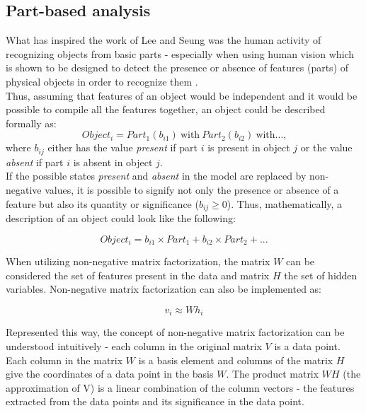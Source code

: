 \documentclass[thesis=M,english]{FITthesis}[2012/10/20]
\begin{document}
\subsection{Part-based analysis}
What has inspired the work of Lee and Seung \cite{lee99} was the human activity
of recognizing objects from basic parts - especially when using human vision which
is shown to be designed to detect the presence or absence of features (parts)
of physical objects in order to recognize them \cite{component-recognition}.
\\

Thus, assuming that features of an object would be independent and it would be
possible to compile all the features together, an object could be described
formally as:
\begin{equation}
  Object_{i} = Part_{1}(b_{i1})~\text{with}~Part_{2}(b_{i2})~\text{with...,}
\end{equation}
where $b_{ij}$ either has the value \emph{present} if part $i$ is present in object $j$ or
the value \emph{absent} if part $i$ is absent in object $j$.
\\

If the possible states \emph{present} and \emph{absent} in the model are
replaced by non-negative values, it is possible to signify not only the
presence or absence of a feature but also its quantity or significance
($b_{ij} \geq 0$). Thus, mathematically, a description of an object could
look like the following:

\begin{equation}
  Object_{i} = b_{i1} \times Part_{1} + b_{i2} \times Part_{2} + ...
\end{equation}\cite{nmf-phd-thesis}

When utilizing non-negative matrix factorization, the matrix $W$ can be
considered the set of features present in the data and matrix $H$ the set
of hidden variables. Non-negative matrix factorization can also be implemented
as:

\begin{equation}
  v_{i} \approx Wh_{i}
\end{equation}

Represented this way, the concept of non-negative matrix factorization can
be understood intuitively - each column in the original matrix $V$ is a data point.
Each column in the matrix $W$ is a basis element and columns of the matrix $H$ give the
coordinates of a data point in the basis $W$. The product matrix $WH$ (the approximation
of V) is a linear combination of the column vectors - the features extracted from
the data points and its significance in the data point.
\\
\end{document}
